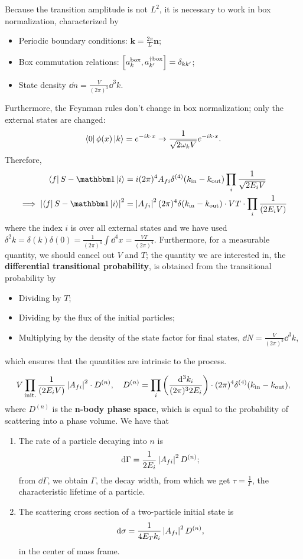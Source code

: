 \documentclass{article}
\begin{document}
Because the transition amplitude is not $L^2$, it is necessary to work in box normalization, characterized by
\begin{itemize}
    \item Periodic boundary conditions: $\mathbf k=\frac{2\pi}L\mathbf n$;
    \item Box commutation relations: $\comm{a^\text{box}_k}{a^{\dag\text{box}}_{k'}}=\delta_{kk'}$;
    \item State density $\dd n=\frac V{(2\pi)^3}\dd^3k$.
\end{itemize}
Furthermore, the Feynman rules don't change in box normalization; only the external states are changed:
$$\bra 0\phi(x)\ket k=e^{-ik\cdot x}\to \frac 1{\sqrt{2\omega_kV}}e^{-ik\cdot x}.$$
Therefore, 
\begin{align*}
    \bra fS-\mathbbm 1\ket i&=i(2\pi)^4A_{fi}\delta^{(4)}(k_\text{in}-k_\text{out})\prod_i\frac 1{\sqrt{2E_iV}}\\
    \implies \abs{\bra fS-\mathbbm 1\ket i}^2&=\abs{A_{fi}}^2(2\pi)^4\delta(k_\text{in}-k_\text{out})\cdot VT\cdot\prod_i\frac 1{(2E_iV)}
\end{align*}
where the index $i$ is over all external states and we have used $\delta^2k=\delta(k)\delta(0)=\frac 1{(2\pi)^4}\int \dd^4x=\frac{VT}{(2\pi)^4}$. Furthermore, for a measurable quantity, we should cancel out $V$ and $T$; the quantity we are interested in, the \textbf{differential transitional probability}, is obtained from the transitional probability by
\begin{itemize}
    \item Dividing by $T$; 
    \item Dividing by the flux of the initial particles;
    \item Multiplying by the density of the state factor for final states, $\dd N=\frac V{(2\pi)^3}\dd^3k$,
\end{itemize}
which ensures that the quantities are intrinsic to the process.

\begin{equation}
    V\prod_\text{init.}\frac 1{(2E_iV)}\left\lvert A_{fi}\right\rvert^2\cdot D^{(n)},\quad D^{(n)}=\prod_i\left(\frac{\dd^3k_i}{(2\pi)^32E_i}\right)\cdot(2\pi)^4\delta^{(4)}(k_\text{in}-k_\text{out}),
\end{equation}
where $D^{(n)}$ is the \textbf{n-body phase space}, which is equal to the probability of scattering into a phase volume. We have that 
\begin{enumerate}
    \item The rate of a particle decaying into $n$ is 
    $$\dd\Gamma=\frac 1{2E_i}\left\lvert A_{fi}\right\rvert^2D^{(n)};$$
    from $\dd\Gamma$, we obtain $\Gamma$, the decay width, from which we get $\tau=\frac 1\Gamma$, the characteristic lifetime of a particle. 
    \item The scattering cross section of a two-particle initial state is 
    $$\dd\sigma=\frac 1{4E_Tk_i}\left\lvert A_{fi}\right\rvert^2D^{(n)},$$
    in the center of mass frame.
\end{enumerate}
\end{document}
